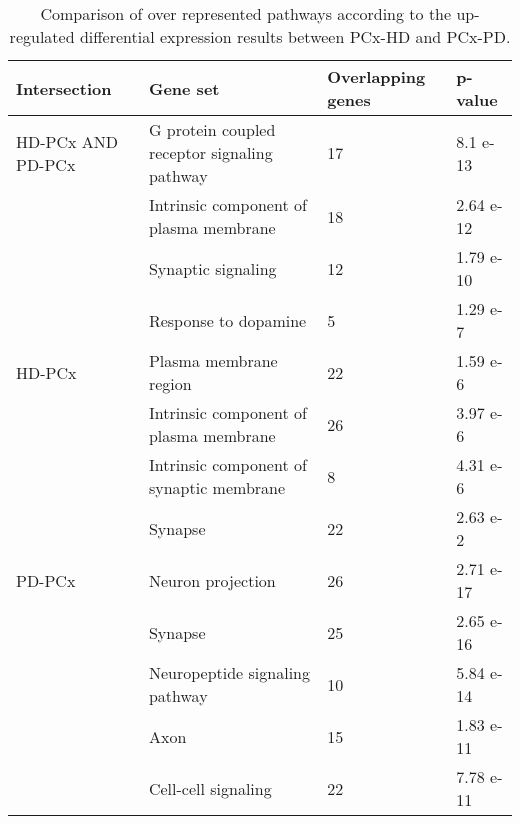 \begin{table}[!ht]
\centering
\caption{Comparison of over represented pathways according to the up-regulated differential expression results between PCx-HD and PCx-PD.}
\begin{tabularx}{11cm}{L{2cm}L{2.5cm}L{3cm}C{1.5cm}}
\toprule
\textbf{Intersection} & \textbf{Gene set} & \textbf{Overlapping genes} & \textbf{p-value} \\
\midrule
HD-PCx AND PD-PCx                      & G protein coupled receptor signaling pathway & 17                         & 8.1 e-13         \\
       & Intrinsic component of plasma membrane   & 18 & 2.64 e-12 \\
       & Synaptic signaling                         & 12 & 1.79 e-10 \\
       & Response to dopamine                       & 5  & 1.29 e-7  \\
HD-PCx & Plasma membrane region                   & 22 & 1.59 e-6  \\
       & Intrinsic component of plasma membrane   & 26 & 3.97 e-6  \\
       & Intrinsic component of synaptic membrane & 8  & 4.31 e-6  \\
       & Synapse                                    & 22 & 2.63 e-2  \\
PD-PCx & Neuron projection                        & 26 & 2.71 e-17 \\
       & Synapse                                    & 25 & 2.65 e-16 \\
       & Neuropeptide signaling pathway           & 10 & 5.84 e-14 \\
       & Axon                                       & 15 & 1.83 e-11 \\
       & Cell-cell signaling                      & 22 & 7.78 e-11 \\
\bottomrule
\end{tabularx}
\end{table}


